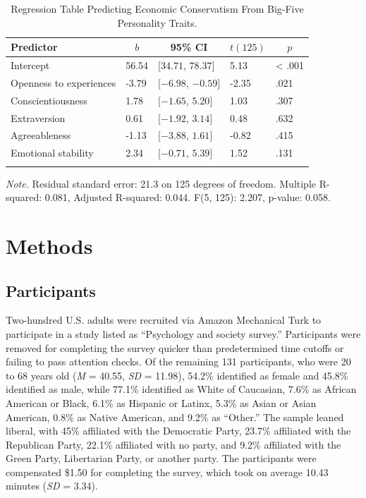 \documentclass[man]{apa6}
\begin{document}
\begin{table}[tbp]
\begin{center}
\begin{threeparttable}
\caption{\label{tab:linearmodels_conservatism_ocean_tables}Regression Table Predicting Economic Conservatism From Big-Five Personality Traits.}
\begin{tabular}{lllll}
\toprule
Predictor & \multicolumn{1}{c}{$b$} & \multicolumn{1}{c}{95\% CI} & \multicolumn{1}{c}{$t(125)$} & \multicolumn{1}{c}{$p$}\\
\midrule
Intercept & 56.54 & $[34.71$, $78.37]$ & 5.13 & < .001\\
Openness to experiences & -3.79 & $[-6.98$, $-0.59]$ & -2.35 & .021\\
Conscientiousness & 1.78 & $[-1.65$, $5.20]$ & 1.03 & .307\\
Extraversion & 0.61 & $[-1.92$, $3.14]$ & 0.48 & .632\\
Agreeableness & -1.13 & $[-3.88$, $1.61]$ & -0.82 & .415\\
Emotional stability & 2.34 & $[-0.71$, $5.39]$ & 1.52 & .131\\
\bottomrule
\addlinespace
\end{tabular}
\begin{tablenotes}[para]
\normalsize{\textit{Note.} Residual standard error: 21.3 on 125 degrees of freedom. Multiple R-squared: 0.081, Adjusted R-squared: 0.044. F(5, 125): 2.207, p-value: 0.058.}
\end{tablenotes}
\end{threeparttable}
\end{center}
\end{table}

\section{Methods}\label{methods}

\subsection{Participants}\label{participants}

Two-hundred U.S. adults were recruited via Amazon Mechanical Turk to
participate in a study listed as \enquote{Psychology and society
survey.} Participants were removed for completing the survey quicker
than predetermined time cutoffs or failing to pass attention checks. Of
the remaining 131 participants, who were 20 to 68 years old (\emph{M} =
40.55, \emph{SD} = 11.98), 54.2\% identified as female and 45.8\%
identified as male, while 77.1\% identified as White of Caucasian, 7.6\%
as African American or Black, 6.1\% as Hispanic or Latinx, 5.3\% as
Asian or Asian American, 0.8\% as Native American, and 9.2\% as
\enquote{Other.} The sample leaned liberal, with 45\% affiliated with
the Democratic Party, 23.7\% affiliated with the Republican Party,
22.1\% affiliated with no party, and 9.2\% affiliated with the Green
Party, Libertarian Party, or another party. The participants were
compensated \$1.50 for completing the survey, which took on average
10.43 minutes (\emph{SD} = 3.34).
\end{document}
